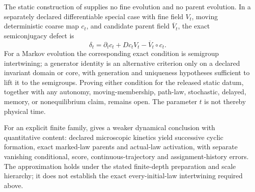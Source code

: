 \medskip
{}
The static construction of  supplies no fine evolution and no
parent evolution. In a separately declared differentiable special case with fine field $V_t$, moving
deterministic coarse map $c_t$, and candidate parent field $\overline V_t$, the exact semiconjugacy
defect is
\begin{equation}
\delta_t=\partial_tc_t+Dc_tV_t-\overline V_t\circ c_t.
\label{eq:rg-pointwise-parent-semiconjugacy-defect}
\end{equation}
For a Markov evolution the corresponding exact condition is semigroup intertwining; a generator
identity is an alternative criterion only on a declared invariant domain or core, with generation
and uniqueness hypotheses sufficient to lift it to the semigroups. Proving either condition for the
released static datum, together with any autonomy, moving-membership, path-law, stochastic,
delayed, memory, or nonequilibrium claim, remains open. The parameter $t$ is not thereby physical
time. 

For an explicit finite family, 
gives a weaker dynamical conclusion with quantitative content: declared
microscopic kinetics yield successive cyclic formation, exact marked-law
parents and actual-law activation, with separate vanishing conditional,
score, continuous-trajectory and assignment-history errors. The approximation
holds under the stated finite-depth preparation and scale hierarchy; it
does not establish the exact every-initial-law intertwining required above.

